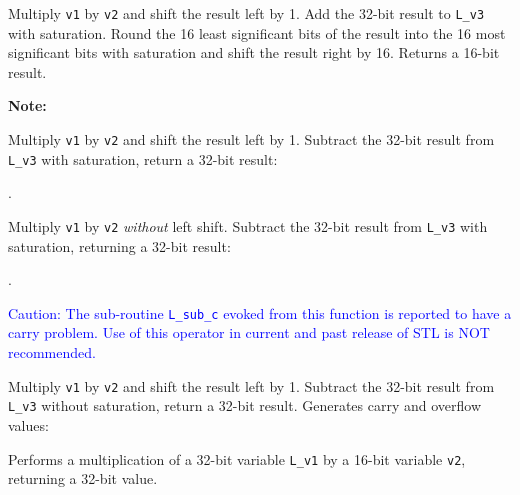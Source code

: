 Multiply {\tt v1} by {\tt v2} and shift the result left by 1. Add
the 32-bit result to {\tt L\_v3} with saturation. Round the 16
least significant bits of the result into the 16 most significant
bits with saturation and shift the result right by 16. Returns a
16-bit result.


\textbf{Note:} \hfill {}


Multiply {\tt v1} by {\tt v2} and shift the result left by 1. Subtract
the 32-bit result from {\tt L\_v3} with saturation, return a 32-bit
result:

.


Multiply {\tt v1} by {\tt v2} {\em without} left shift. Subtract the
32-bit result from {\tt L\_v3} with saturation, returning a 32-bit
result:

.


\textcolor{blue}{
%
  Caution: The sub-routine {\tt L\_sub\_c} evoked from this function
  is reported to have a carry problem. Use of this operator in current
  and past release of STL is NOT recommended.
%
}

Multiply {\tt v1} by {\tt v2} and shift the result left by 1. Subtract
the 32-bit result from {\tt L\_v3} without saturation, return a 32-bit
result. Generates carry and overflow values:




Performs a multiplication of a 32-bit variable {\tt L\_v1} by a 16-bit variable {\tt v2}, returning a 32-bit value.

